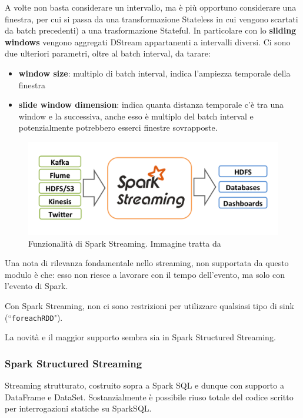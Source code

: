 \documentclass[12pt,italian]{article}
\begin{document}
A volte non basta considerare un intervallo, ma è più opportuno considerare una finestra, per cui si passa da una transformazione Stateless in cui vengono scartati da batch precedenti) a una trasformazione Stateful. In particolare con lo \textbf{sliding windows} vengono aggregati DStream appartanenti a intervalli diversi.
Ci sono due ulteriori parametri, oltre al batch interval, da tarare:
\begin{itemize}
	\item \textbf{window size}: multiplo di batch interval, indica l'ampiezza temporale della finestra
	\item \textbf{slide window dimension}: indica quanta distanza temporale c'è tra una window e la successiva, anche esso è multiplo del batch interval e potenzialmente potrebbero esserci finestre sovrapposte.
\end{itemize}
\begin{figure}
	\centering 
	\includegraphics[width=0.8\linewidth]{img/sparkStreaming.png}
	\caption{Funzionalità di Spark Streaming. Immagine tratta da \cite{spark}}
	\label{fig:SparkStreaming}
\end{figure}
\par Una nota di rilevanza fondamentale nello streaming, non supportata da questo modulo è che: esso non riesce a lavorare con il tempo dell'evento, ma solo con l'evento di Spark.

\par Con Spark Streaming, non ci sono restrizioni per utilizzare qualsiasi tipo di sink (``\texttt{foreachRDD}"). %

\par La novità e il maggior supporto sembra sia in Spark Structured Streaming.
\subsubsection{Spark Structured Streaming}\label{sec:structuredstreaming}
Streaming strutturato, costruito sopra a Spark SQL e dunque con supporto a DataFrame e DataSet. 
Sostanzialmente è possibile riuso totale del codice scritto per interrogazioni statiche su SparkSQL.
\end{document}
